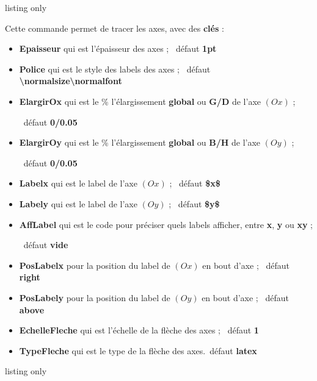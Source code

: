 \documentclass[a4paper,french,11pt]{article}
\newcommand\cmaj[1]{%
	{\tcbox[vignetteMaJ]{#1}\xspace}%
}
\newcommand\Cle[1]{{\bfseries\sffamily\textlangle \textcolor{orange!75!black}{#1}\textrangle}}
\begin{document}
\begin{PresCodeTexPL}{listing only}
\AxesTikz[options]
\end{PresCodeTexPL}

\begin{cautionblock}
Cette commande permet de tracer les axes, avec des \Cle{clés} :

\begin{itemize}
	\item \Cle{Epaisseur} qui est l'épaisseur des axes ; \hfill~défaut \Cle{1pt}
	\item \Cle{Police} qui est le style des labels des axes  ; \hfill~défaut \Cle{\textbackslash{}normalsize\textbackslash{}normalfont}
	\item \cmaj{2.1.2} \Cle{ElargirOx} qui est le \% l'élargissement \Cle{global} ou \Cle{G/D} de l'axe $(Ox)$ ;
	
	\hfill~défaut \Cle{0/0.05}
	\item \cmaj{2.1.2} \Cle{ElargirOy} qui est le \% l'élargissement \Cle{global} ou \Cle{B/H} de l'axe $(Oy)$ ;
	
	\hfill~défaut \Cle{0/0.05}
	\item \Cle{Labelx} qui est le label de l'axe $(Ox)$ ; \hfill~défaut \Cle{\${}x\$}
	\item \Cle{Labely} qui est le label de l'axe $(Oy)$ ; \hfill~défaut \Cle{\${}y\$}
	\item \Cle{AffLabel} qui est le code pour préciser quels labels afficher, entre \Cle{x}, \Cle{y} ou \Cle{xy} ;
	
	\hfill~défaut \Cle{vide}
	\item \Cle{PosLabelx} pour la position du label de $(Ox)$ en bout d'axe ; \hfill~défaut \Cle{right}
	\item \Cle{PosLabely} pour la position du label de $(Oy)$ en bout d'axe ; \hfill~défaut \Cle{above}
	\item \Cle{EchelleFleche} qui est l'échelle de la flèche des axes ; \hfill~défaut \Cle{1}
	\item \Cle{TypeFleche} qui est le type de la flèche des axes.\hfill~défaut \Cle{latex}
\end{itemize}
\vspace*{-\baselineskip}\leavevmode
\end{cautionblock}

\begin{PresCodeTexPL}{listing only}
\AxesTikz

\AxesTikz%
	[AffLabel=xy,Labelx={Nombre de jours},Labely={Nombre d'individus infectés, en centaines},%
	PosLabelx={above left},PosLabely={above right},%
	Police=\small\sffamily,ElargirOx=0,ElargirOy=0]
\end{PresCodeTexPL}
\end{document}
